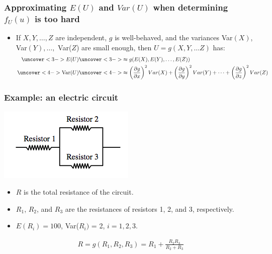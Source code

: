 \documentclass[handout]{beamer}\usepackage[]{graphicx}\usepackage[]{color}
\numberwithin{equation}{section}
\begin{document}
\begin{frame}
\frametitle{\small Approximating $E(U)$ and $Var(U)$ when determining $f_U(u)$ is too hard} \scriptsize
\begin{itemize}
\pause \item If $X, Y, \ldots, Z$ are independent, $g$ is well-behaved, and the variances Var$(X)$, Var$(Y), \ldots,$ Var($Z$) are small enough, then $U = g(X, Y, \ldots Z)$ has:
\begin{align*}
\uncover<3->{E(U)} &\uncover<3->{\approx g(E(X), E(Y), \ldots, E(Z))} \\
\uncover<4->{\text{Var}(U)} & \uncover<4->{\approx \left ( \frac{\partial g}{\partial x}\right )^2 Var(X) + \left ( \frac{\partial g}{\partial y}\right )^2 Var(Y) + \cdots + \left ( \frac{\partial g}{\partial z}\right )^2 Var(Z)}
\end{align*}
\end{itemize}
\end{frame}

\begin{frame}
\frametitle{Example: an electric circuit}
\begin{center}
 \includegraphics{../../fig/resist.png}
\end{center}
\begin{itemize}
\pause \item $R$ is the total resistance of the circuit.
\pause \item $R_1$, $R_2$, and $R_3$ are the resistances of resistors 1, 2, and 3, respectively.
\pause \item $E(R_i) = 100$, Var($R_i)$ = 2, $i = 1,2,3$. 
\end{itemize}
\pause \begin{align*}
R = g(R_1, R_2, R_3) = R_1 + \frac{R_2 R_3}{R_2 + R_3}
\end{align*}
\end{frame}
\end{document}

